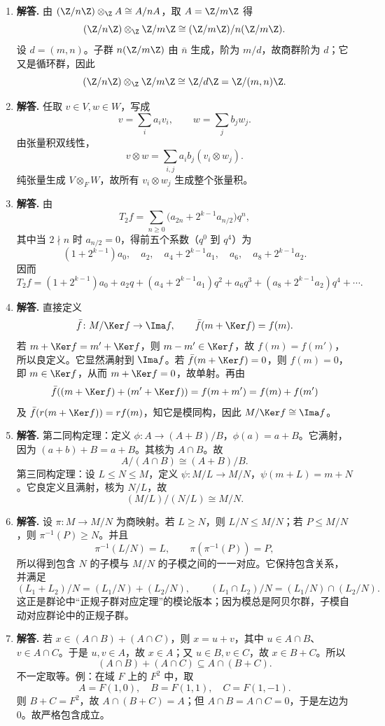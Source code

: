 \begin{enumerate}[label=\textbf{\arabic*.}, leftmargin=*, itemsep=1em]
  \item \textbf{解答.} 由 $(\Z/n\Z)\otimes_\Z A\cong A/nA$，取 $A=\Z/m\Z$ 得
  \[
  (\Z/n\Z)\otimes_\Z \Z/m\Z\cong (\Z/m\Z)/n(\Z/m\Z).
  \]
  设 $d=(m,n)$。子群 $n(\Z/m\Z)$ 由 $\bar n$ 生成，阶为 $m/d$，故商群阶为 $d$；它又是循环群，因此
  \[
  (\Z/n\Z)\otimes_\Z \Z/m\Z\cong \Z/d\Z=\Z/(m,n)\Z.
  \]

  \item \textbf{解答.} 任取 $v\in V,w\in W$，写成
  \[
  v=\sum_i a_iv_i,\qquad w=\sum_j b_jw_j.
  \]
  由张量积双线性，
  \[
  v\otimes w=\sum_{i,j} a_ib_j(v_i\otimes w_j).
  \]
  纯张量生成 $V\otimes_FW$，故所有 $v_i\otimes w_j$ 生成整个张量积。

  \item \textbf{解答.} 由
  \[
  T_2f=\sum_{n\ge 0}\bigl(a_{2n}+2^{k-1}a_{n/2}\bigr)q^n,
  \]
  其中当 $2\nmid n$ 时 $a_{n/2}=0$，得前五个系数（$q^0$ 到 $q^4$）为
  \[
  (1+2^{k-1})a_0,\quad a_2,\quad a_4+2^{k-1}a_1,\quad a_6,\quad a_8+2^{k-1}a_2.
  \]
  因而
  \[
  T_2f=(1+2^{k-1})a_0+a_2q+(a_4+2^{k-1}a_1)q^2+a_6q^3+(a_8+2^{k-1}a_2)q^4+\cdots.
  \]

  \item \textbf{解答.} 直接定义
  \[
  \bar f\colon M/\Ker f\to \Ima f,\qquad \bar f(m+\Ker f)=f(m).
  \]
  若 $m+\Ker f=m'+\Ker f$，则 $m-m'\in\Ker f$，故 $f(m)=f(m')$，所以良定义。它显然满射到 $\Ima f$。若 $\bar f(m+\Ker f)=0$，则 $f(m)=0$，即 $m\in\Ker f$，从而 $m+\Ker f=0$，故单射。再由
  \[
  \bar f((m+\Ker f)+(m'+\Ker f))=f(m+m')=f(m)+f(m')
  \]
  及 $\bar f(r(m+\Ker f))=rf(m)$，知它是模同构，因此 $M/\Ker f\cong \Ima f$。

  \item \textbf{解答.} 第二同构定理：定义 $\phi\colon A\to (A+B)/B$，$\phi(a)=a+B$。它满射，因为 $(a+b)+B=a+B$。其核为 $A\cap B$。故
  \[
  A/(A\cap B)\cong (A+B)/B.
  \]
  第三同构定理：设 $L\le N\le M$，定义 $\psi\colon M/L\to M/N$，$\psi(m+L)=m+N$。它良定义且满射，核为 $N/L$，故
  \[
  (M/L)/(N/L)\cong M/N.
  \]

  \item \textbf{解答.} 设 $\pi\colon M\to M/N$ 为商映射。若 $L\ge N$，则 $L/N\le M/N$；若 $P\le M/N$，则 $\pi^{-1}(P)\ge N$。并且
  \[
  \pi^{-1}(L/N)=L,
  \qquad
  \pi(\pi^{-1}(P))=P,
  \]
  所以得到包含 $N$ 的子模与 $M/N$ 的子模之间的一一对应。它保持包含关系，并满足
  \[
  (L_1+L_2)/N=(L_1/N)+(L_2/N),\qquad (L_1\cap L_2)/N=(L_1/N)\cap(L_2/N).
  \]
  这正是群论中“正规子群对应定理”的模论版本；因为模总是阿贝尔群，子模自动对应群论中的正规子群。

  \item \textbf{解答.} 若 $x\in (A\cap B)+(A\cap C)$，则 $x=u+v$，其中 $u\in A\cap B$、$v\in A\cap C$。于是 $u,v\in A$，故 $x\in A$；又 $u\in B,v\in C$，故 $x\in B+C$。所以
  \[
  (A\cap B)+(A\cap C)\subseteq A\cap(B+C).
  \]
  不一定取等。例：在域 $F$ 上的 $F^2$ 中，取
  \[
  A=F(1,0),\quad B=F(1,1),\quad C=F(1,-1).
  \]
  则 $B+C=F^2$，故 $A\cap(B+C)=A$；但 $A\cap B=A\cap C=0$，于是左边为 $0$。故严格包含成立。


\end{enumerate}
